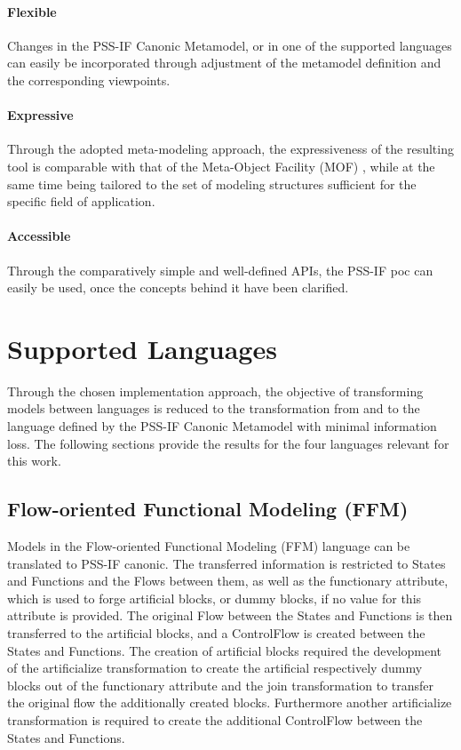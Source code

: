 \paragraph{Flexible} Changes in the PSS-IF Canonic Metamodel, or in one of the supported languages can easily be incorporated through adjustment of the metamodel definition and the corresponding viewpoints.

\paragraph{Expressive} Through the adopted meta-modeling approach, the expressiveness of the resulting tool is comparable with that of the Meta-Object Facility (MOF) \cite{ref:mof}, while at the same time being tailored to the set of modeling structures sufficient for the specific field of application.

\paragraph{Accessible} Through the comparatively simple and well-defined APIs, the PSS-IF \gls{poc} can easily be used, once the concepts behind it have been clarified.

\section{Supported Languages}
\label{sec:results:languages}

Through the chosen implementation approach, the objective of transforming models between languages is reduced to the transformation from and to the language defined by the PSS-IF Canonic Metamodel with minimal information loss. The following sections provide the results for the four languages relevant for this work.

\subsection{Flow-oriented Functional Modeling (FFM)}

Models in the Flow-oriented Functional Modeling (FFM) language can be translated to PSS-IF canonic. The transferred information is restricted to States and Functions and the Flows between them, as well as the functionary attribute, which is used to forge artificial blocks, or dummy blocks, if no value for this attribute is provided. The original Flow between the States and Functions is then transferred to the artificial blocks, and a ControlFlow is created between the States and Functions. The creation of artificial blocks required the development of the artificialize transformation to create the artificial respectively dummy blocks out of the functionary attribute and the join transformation to transfer the original flow the additionally created blocks. Furthermore another artificialize transformation is required to create the additional ControlFlow between the States and Functions.

